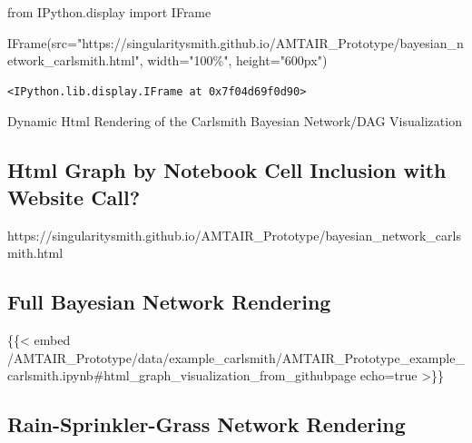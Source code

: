 \documentclass[
  11pt,
  letterpaper,
]{book}
\newenvironment{Shaded}{\begin{snugshade}}{\end{snugshade}}
\newcommand{\ImportTok}[1]{\textcolor[rgb]{0.00,0.46,0.62}{#1}}
\newcommand{\NormalTok}[1]{\textcolor[rgb]{0.00,0.23,0.31}{#1}}
\newcommand{\OperatorTok}[1]{\textcolor[rgb]{0.37,0.37,0.37}{#1}}
\newcommand{\StringTok}[1]{\textcolor[rgb]{0.13,0.47,0.30}{#1}}
\begin{document}
\begin{Shaded}
\begin{Highlighting}[]
\ImportTok{from}\NormalTok{ IPython.display }\ImportTok{import}\NormalTok{ IFrame}

\NormalTok{IFrame(src}\OperatorTok{=}\StringTok{"https://singularitysmith.github.io/AMTAIR\_Prototype/bayesian\_network\_carlsmith.html"}\NormalTok{, width}\OperatorTok{=}\StringTok{"100\%"}\NormalTok{, height}\OperatorTok{=}\StringTok{"600px"}\NormalTok{)}
\end{Highlighting}
\end{Shaded}

\label{html_graph_visualization_from_githubpage}
\begin{verbatim}
<IPython.lib.display.IFrame at 0x7f04d69f0d90>
\end{verbatim}

Dynamic Html Rendering of the Carlsmith Bayesian Network/DAG
Visualization

\subsection*{Html Graph by Notebook Cell Inclusion with Website
Call?}\label{html-graph-by-notebook-cell-inclusion-with-website-call}

https://singularitysmith.github.io/AMTAIR\_Prototype/bayesian\_network\_carlsmith.html

\subsection*{Full Bayesian Network
Rendering}\label{full-bayesian-network-rendering}

\begin{Shaded}
\begin{Highlighting}[]
\NormalTok{\{\{\textless{} embed /AMTAIR\_Prototype/data/example\_carlsmith/AMTAIR\_Prototype\_example\_carlsmith.ipynb\#html\_graph\_visualization\_from\_githubpage  echo=true \textgreater{}\}\}}
\end{Highlighting}
\end{Shaded}

\subsection*{Rain-Sprinkler-Grass Network
Rendering}\label{rain-sprinkler-grass-network-rendering}
\end{document}
